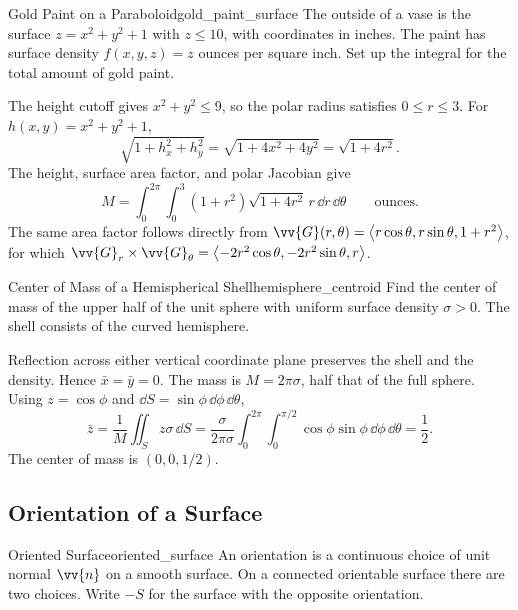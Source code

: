 \newpage
\begin{problem}{Gold Paint on a Paraboloid}{gold_paint_surface}
The outside of a vase is the surface $z = x^2 + y^2 + 1$ with $z \le 10$, with coordinates in inches. The paint has surface density $f(x,y,z) = z$ ounces per square inch. Set up the integral for the total amount of gold paint.
\end{problem}
\begin{sol}
The height cutoff gives $x^2 + y^2 \le 9$, so the polar radius satisfies $0 \le r \le 3$. For $h(x,y) = x^2 + y^2 + 1$,
\[
    \sqrt{1 + h_x^2 + h_y^2} = \sqrt{1 + 4x^2 + 4y^2} = \sqrt{1 + 4r^2}.
\]
The height, surface area factor, and polar Jacobian give
\[
    \boxed{M = \int_0^{2\pi}\int_0^3 (1 + r^2)\sqrt{1 + 4r^2}\,r\,\dd{r}\,\dd{\theta}}
    \qquad \text{ounces}.
\]
The same area factor follows directly from $\vv{G}(r,\theta) = \ang{r\cos\theta,r\sin\theta,1 + r^2}$, for which $\vv{G}_r \times \vv{G}_{\theta} = \ang{-2r^2\cos\theta,-2r^2\sin\theta,r}$.
\end{sol}

\begin{problem}{Center of Mass of a Hemispherical Shell}{hemisphere_centroid}
Find the center of mass of the upper half of the unit sphere with uniform surface density $\sigma > 0$. The shell consists of the curved hemisphere.
\end{problem}
\begin{sol}
Reflection across either vertical coordinate plane preserves the shell and the density. Hence $\bar{x} = \bar{y} = 0$. The mass is $M = 2\pi\sigma$, half that of the full sphere. Using $z = \cos\phi$ and $\dd{S} = \sin\phi\,\dd{\phi}\,\dd{\theta}$,
\[
    \bar{z} = \frac{1}{M}\iint_S z\sigma\,\dd{S}
    = \frac{\sigma}{2\pi\sigma}\int_0^{2\pi}\int_0^{\pi/2}
        \cos\phi\sin\phi\,\dd{\phi}\,\dd{\theta}
    = \frac{1}{2}.
\]
The center of mass is $\boxed{(0,0,1/2)}$.
\end{sol}

\newpage
\subsection{Orientation of a Surface}

\begin{definition}{Oriented Surface}{oriented_surface}
An orientation is a continuous choice of unit normal $\vv{n}$ on a smooth surface. On a connected orientable surface there are two choices. Write $-S$ for the surface with the opposite orientation.
\end{definition}

